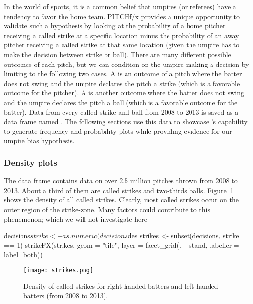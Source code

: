 \begin{article}
In the world of sports, it is a common belief that umpires (or referees)
have a tendency to favor the home team. PITCHf/x provides a unique
opportunity to validate such a hypothesis by looking at the probability
of a home pitcher receiving a called strike at a specific location
minus the probability of an away pitcher receiving a called strike
at that same location (given the umpire has to make the decision between
strike or ball). There are many different possible outcomes of each
pitch, but we can condition on the umpire making a decision by limiting
to the following two cases. A  is an outcome of
a pitch where the batter does not swing and the umpire declares the
pitch a strike (which is a favorable outcome for the pitcher). A 
is another outcome where the batter does not swing and the umpire declares
the pitch a ball (which is a favorable outcome for the batter). Data
from every called strike and ball from 2008 to 2013 is saved as a
data frame named . The following sections use this
data to showcase 's capability to generate frequency
and probability plots while providing evidence for our umpire bias
hypothesis.

\subsubsection{Density plots}

The  data frame contains data on over 2.5 million
pitches thrown from 2008 to 2013. About a third of them are called
strikes and two-thirds balls. Figure~\ref{fig:STRIKES} shows the
density of all called strikes. Clearly, most called strikes occur
on the outer region of the strike-zone. Many factors could contribute
to this phenomenon; which we will not investigate here.
%
\begin{Schunk}
\begin{Sinput}
decisions$strike <- as.numeric(decisions$des %in% "Called Strike")
strikes <- subset(decisions, strike == 1)
strikeFX(strikes, geom = "tile", layer = facet_grid(. ~ stand, labeller = label_both))
\end{Sinput}
\end{Schunk}

\begin{figure}[h]
\centerline{\texttt{[image: strikes.png]}}
\caption{\label{fig:STRIKES} Density of called strikes for right-handed batters
and left-handed batters (from 2008 to 2013).}
\end{figure}


\end{article}
